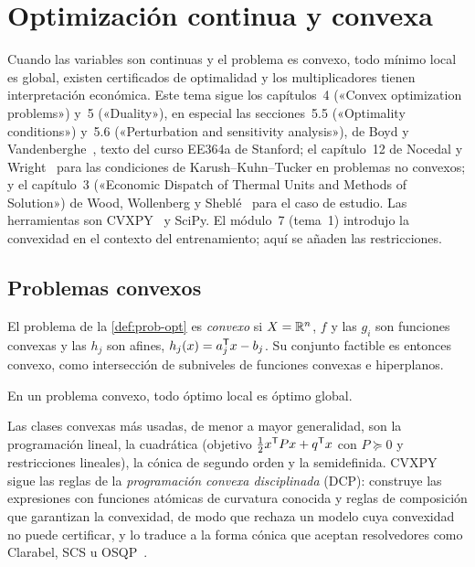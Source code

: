 \chapter{Optimización continua y convexa}
\label{tema:4}

Cuando las variables son continuas y el problema es convexo, todo mínimo local es global, existen certificados de optimalidad y los multiplicadores tienen interpretación económica. Este tema sigue los capítulos~4 («Convex optimization problems») y~5 («Duality»), en especial las secciones~5.5 («Optimality conditions») y~5.6 («Perturbation and sensitivity analysis»), de Boyd y Vandenberghe~\cite{bv}, texto del curso EE364a de Stanford; el capítulo~12 de Nocedal y Wright~\cite{nw} para las condiciones de Karush--Kuhn--Tucker en problemas no convexos; y el capítulo~3 («Economic Dispatch of Thermal Units and Methods of Solution») de Wood, Wollenberg y Sheblé~\cite{wood} para el caso de estudio. Las herramientas son CVXPY~\cite{cvxpy,cvxpydoc} y SciPy. El módulo~7 (tema~1) introdujo la convexidad en el contexto del entrenamiento; aquí se añaden las restricciones.

\section{Problemas convexos}

\begin{definicion}\label{def:convexo}
El problema de la \cref{def:prob-opt} es \emph{convexo} si $X=\mathbb{R}^{n}$, $f$ y las $g_i$ son funciones convexas y las $h_j$ son afines, $h_j(x)=a_j^{\mathsf{T}} x-b_j$. Su conjunto factible es entonces convexo, como intersección de subniveles de funciones convexas e hiperplanos.
\end{definicion}

\begin{teorema}\label{teo:local-global}
En un problema convexo, todo óptimo local es óptimo global.
\end{teorema}

Las clases convexas más usadas, de menor a mayor generalidad, son la programación lineal, la cuadrática (objetivo $\tfrac12x^{\mathsf{T}} Px+q^{\mathsf{T}} x$ con $P\succeq 0$ y restricciones lineales), la cónica de segundo orden y la semidefinida. CVXPY sigue las reglas de la \emph{programación convexa disciplinada} (DCP): construye las expresiones con funciones atómicas de curvatura conocida y reglas de composición que garantizan la convexidad, de modo que rechaza un modelo cuya convexidad no puede certificar, y lo traduce a la forma cónica que aceptan resolvedores como Clarabel, SCS u OSQP~\cite{cvxpy,cvxpydoc}.

